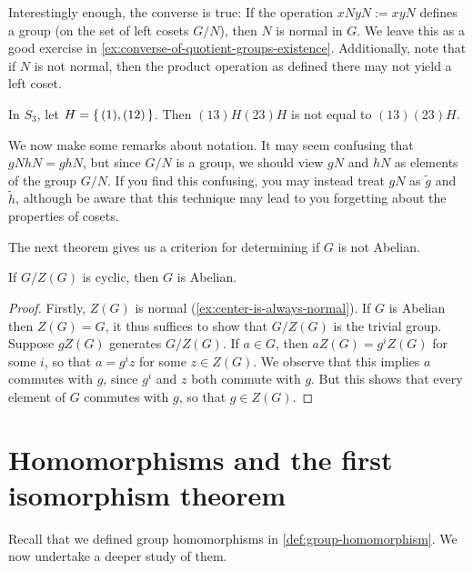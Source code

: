 \documentclass[./main.tex]{subfiles}
\begin{document}
Interestingly enough, the converse is true: If the operation $xN yN := xyN$
defines a group (on the set of left cosets $G/N$), then $N$ is normal in $G$. We
leave this as a good exercise in \cref{ex:converse-of-quotient-groups-existence}.
Additionally, note that if $N$ is not normal, then the product operation as
defined there may not yield a left coset. 

\begin{example}
    In $S_3$, let $H = \set{(1), (12)}$. Then $(13) H (23) H$ is not equal to
    $(13)(23)H$.
\end{example}

We now make some remarks about notation. It may seem confusing that $gN hN =
ghN$, but since $G/N$ is a group, we should view $gN$ and $hN$ as elements of
the group $G/N$. If you find this confusing, you may instead treat $gN$ as
$\tilde g$ and $\tilde h$, although be aware that this technique may lead to you
forgetting about the properties of cosets.

The next theorem gives us a criterion for determining if $G$ is not Abelian. 
\begin{theorem}
\label{thm:g-z-theorem}
    If $G/Z(G)$ is cyclic, then $G$ is Abelian.
\end{theorem}
\begin{proof}
    Firstly, $Z(G)$ is normal (\cref{ex:center-is-always-normal}). If $G$ is
    Abelian then $Z(G) = G$, it thus suffices to show that $G/Z(G)$ is the
    trivial group. Suppose $gZ(G)$ generates $G/Z(G)$. If $a \in G$, then $aZ(G)
    = g^i Z(G)$ for some $i$, so that $a = g^i z$ for some $z \in Z(G)$. We
    observe that this implies $a$ commutes with $g$, since $g^i$ and $z$ both
    commute with $g$. But this shows that every element of $G$ commutes with
    $g$, so that $g \in Z(G)$. 
\end{proof}


\section{Homomorphisms and the first isomorphism theorem}
Recall that we defined group homomorphisms in \cref{def:group-homomorphism}. We
now undertake a deeper study of them. 
\end{document}
